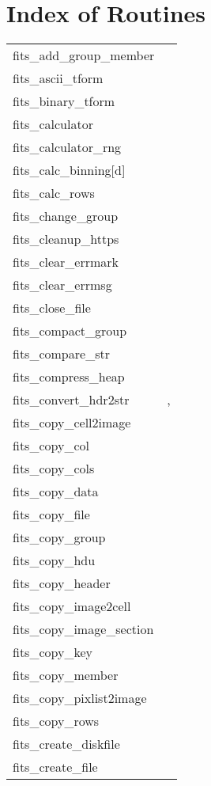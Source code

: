 \documentclass[11pt]{book}
\begin{document}
\chapter{Index of Routines }
\begin{tabular}{lr}
fits\_add\_group\_member & \pageref{ffgtam} \\
fits\_ascii\_tform    & \pageref{ffasfm} \\
fits\_binary\_tform   & \pageref{ffbnfm} \\
fits\_calculator     & \pageref{ffcalc} \\
fits\_calculator\_rng     & \pageref{ffcalcrng} \\
fits\_calc\_binning[d] & \pageref{calcbinning} \\
fits\_calc\_rows    & \pageref{ffcrow} \\
fits\_change\_group  & \pageref{ffgtch} \\
fits\_cleanup\_https & \pageref{ffchtps} \\
fits\_clear\_errmark  & \pageref{ffpmrk} \\
fits\_clear\_errmsg   & \pageref{ffcmsg} \\
fits\_close\_file     & \pageref{ffclos} \\
fits\_compact\_group & \pageref{ffgtcm} \\
fits\_compare\_str    & \pageref{ffcmps} \\
fits\_compress\_heap & \pageref{ffcmph} \\
fits\_convert\_hdr2str  & \pageref{ffhdr2str}, \pageref{hdr2str} \\
fits\_copy\_cell2image & \pageref{copycell} \\
fits\_copy\_col     & \pageref{ffcpcl} \\
fits\_copy\_cols    & \pageref{ffccls} \\
fits\_copy\_data      & \pageref{ffcpdt} \\
fits\_copy\_file      & \pageref{ffcpfl} \\
fits\_copy\_group    & \pageref{ffgtcp} \\
fits\_copy\_hdu       & \pageref{ffcopy} \\
fits\_copy\_header    & \pageref{ffcphd} \\
fits\_copy\_image2cell & \pageref{copycell} \\
fits\_copy\_image\_section  & \pageref{ffcpimg} \\
fits\_copy\_key           & \pageref{ffcpky} \\
fits\_copy\_member    & \pageref{ffgmcp} \\
fits\_copy\_pixlist2image & \pageref{copypixlist2image} \\
fits\_copy\_rows &   \pageref{ffcprw} \\
fits\_create\_diskfile    & \pageref{ffinit} \\
fits\_create\_file    & \pageref{ffinit} \\

\end{tabular}
\end{document}
